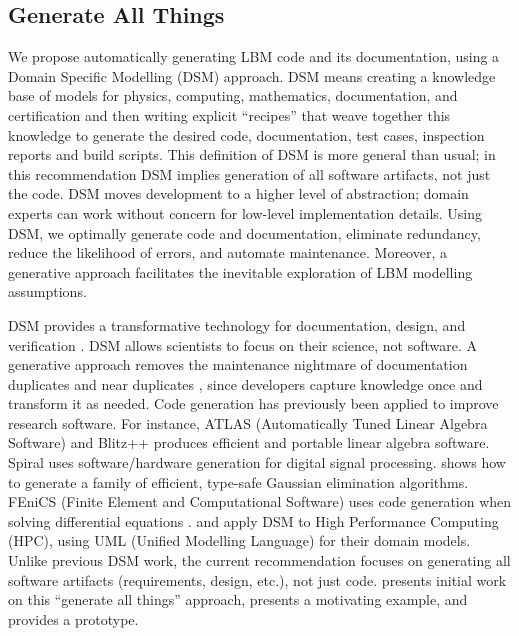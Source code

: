 \documentclass[final, 3p, times, authoryear]{elsarticle}
\begin{document}
\subsection{Generate All Things} \label{Sec_GenAllThings}

We propose automatically generating LBM code and its documentation, using a
Domain Specific Modelling (DSM) approach. DSM means creating a knowledge base of
models for physics, computing, mathematics, documentation, and certification and
then writing explicit ``recipes'' that weave together this knowledge to generate
the desired code, documentation, test cases, inspection reports and build
scripts. This definition of DSM is more general than usual; in this
recommendation DSM implies generation of all software artifacts, not just the
code. DSM moves development to a higher level of abstraction; domain experts can
work without concern for low-level implementation details. Using DSM, we
optimally generate code and documentation, eliminate redundancy, reduce the
likelihood of errors, and automate maintenance. Moreover, a generative approach
facilitates the inevitable exploration of LBM modelling assumptions.

DSM provides a transformative technology for documentation, design, and
verification \citep{JohansonAndHasselbring2018, Smith2018}. DSM allows
scientists to focus on their science, not software.  A generative approach
removes the maintenance nightmare of documentation duplicates and near
duplicates \citep{LucivEtAl2018}, since developers capture knowledge once and
transform it as needed.  Code generation has previously been applied to improve
research software.  For instance, ATLAS (Automatically Tuned Linear Algebra
Software) \citep{WhaleyEtAl2001} and Blitz++ \citep{Veldhuizen1998} produces
efficient and portable linear algebra software.  Spiral \citep{Pueschel2001}
uses software/hardware generation for digital signal processing.
\citet{Carette2008} shows how to generate a family of efficient, type-safe
Gaussian elimination algorithms.  FEniCS (Finite Element and Computational
Software) uses code generation when solving differential equations
\citep{LoggEtAl2012}. \citet{OberEtAl2018} and \citet{MatkerimEtAl2013} apply
DSM to High Performance Computing (HPC), using UML (Unified Modelling Language)
for their domain models. Unlike previous DSM work, the current recommendation
focuses on generating all software artifacts (requirements, design, etc.), not
just code.  \citet{SzymczakEtAl2016} presents initial work on this ``generate
all things'' approach, \citet{SmithAndCarette2021-BRIC} presents a motivating
example, and \citep{CaretteEtAl2021-Drasil} provides a prototype.
\end{document}
